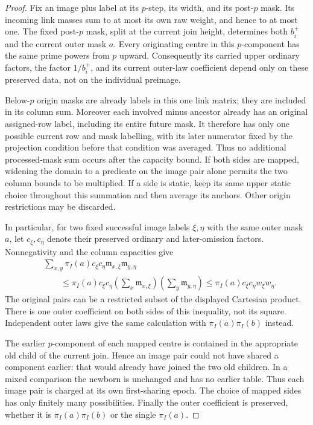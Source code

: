 \begin{proof}
Fix an image plus label at its $p$-step, its width, and its post-$p$
mask. Its incoming link masses sum to at most its own raw weight,
and hence to at most one. The fixed post-$p$ mask, split at the
current join height, determines both
$b_i^+$ and the current outer mask $a$. Every originating centre in
this $p$-component has the same prime powers from $p$ upward.
Consequently its carried upper ordinary factors, the factor
$1/b_i^+$, and its current outer-law coefficient depend only on these
preserved data, not on the individual preimage.

Below-$p$ origin masks are already labels in this one link matrix;
they are included in its column sum. Moreover each involved minus
ancestor already has an original assigned-row label, including its
entire future mask. It therefore has only one possible current row
and mask labelling, with its later numerator fixed by the projection
condition before that condition was averaged. Thus no additional processed-mask sum occurs
after the capacity bound. If both sides are mapped, widening the
domain to a predicate on the image pair alone permits the two column
bounds to be multiplied. If a side is static, keep its same upper
static choice throughout this summation and then average its anchors.
Other origin restrictions may be discarded.

In particular, for two fixed successful image labels $\xi,\eta$
with the same outer mask $a$, let $c_\xi,c_\eta$ denote their
preserved ordinary and later-omission factors. Nonnegativity and
the column capacities give
\begin{equation}\label{join:one-law-capacity}
 \begin{split}
 &\sum_{x,y}\pi_I(a)c_\xi c_\eta
           \mathfrak m_{x,\xi}\mathfrak m_{y,\eta}\\
 &\qquad\le
 \pi_I(a)c_\xi c_\eta
       \left(\sum_x\mathfrak m_{x,\xi}\right)
       \left(\sum_y\mathfrak m_{y,\eta}\right)
 \le \pi_I(a)c_\xi c_\eta w_\xi w_\eta.
 \end{split}
\end{equation}
The original pairs can be a restricted subset of the displayed
Cartesian product. There is one outer coefficient on both sides
of this inequality, not its square. Independent outer laws give
the same calculation with $\pi_I(a)\pi_I(b)$ instead.

The earlier $p$-component of each mapped centre is contained in the
appropriate old child of the current join. Hence an image pair could
not have shared a component earlier: that would already have joined
the two old children. In a mixed comparison the newborn is unchanged
and has no earlier table. Thus each image pair is charged at its own
first-sharing epoch. The choice of mapped sides has only finitely
many possibilities. Finally the outer coefficient is preserved,
whether it is $\pi_I(a)\pi_I(b)$ or the single $\pi_I(a)$.
\end{proof}

